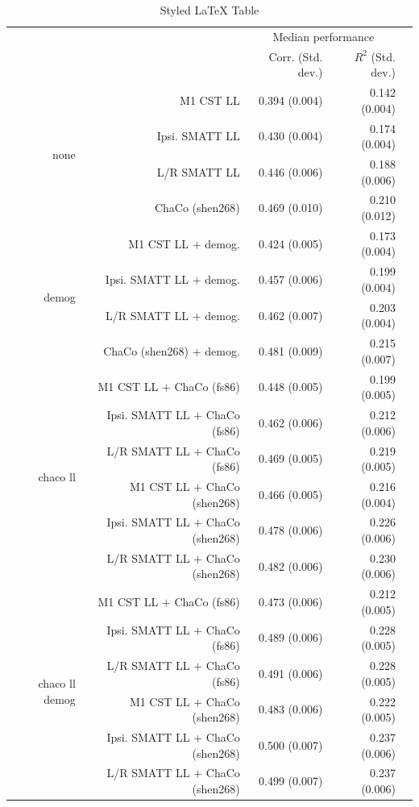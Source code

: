 \documentclass[10pt]{article}
\def\Plus{\texttt{+}}
\begin{document}
\begin{table}[h]
\centering
\caption{Styled LaTeX Table}
\label{table:5}
\begin{tabular}{rrrrr}
\toprule
 &  & \multicolumn{2}{c}{Median performance} \\
 &  & Corr. (Std. dev.) & $R^2$ (Std. dev.) \\
\midrule
\multirow[t]{4}{*}{none} & M1 CST LL & 0.394 (0.004) & 0.142 (0.004) \\
 & Ipsi. SMATT LL & 0.430 (0.004) & 0.174 (0.004) \\
 & L/R SMATT LL & 0.446 (0.006) & 0.188 (0.006) \\
 & ChaCo (shen268) & 0.469 (0.010) & 0.210 (0.012) \\
\multirow[t]{4}{*}{demog} & M1 CST LL $\Plus$ demog. & 0.424 (0.005) & 0.173 (0.004) \\
 & Ipsi. SMATT LL $\Plus$ demog. & 0.457 (0.006) & 0.199 (0.004) \\
 & L/R SMATT LL $\Plus$ demog. & 0.462 (0.007) & 0.203 (0.004) \\
 & ChaCo (shen268) $\Plus$ demog. & 0.481 (0.009) & 0.215 (0.007) \\
\multirow[t]{6}{*}{chaco ll} & M1 CST LL $\Plus$ ChaCo (fs86) & 0.448 (0.005) & 0.199 (0.005) \\
 & Ipsi. SMATT LL $\Plus$ ChaCo (fs86) & 0.462 (0.006) & 0.212 (0.006) \\
 & L/R SMATT LL $\Plus$ ChaCo (fs86) & 0.469 (0.005) & 0.219 (0.005) \\
 & M1 CST LL $\Plus$ ChaCo (shen268) & 0.466 (0.005) & 0.216 (0.004) \\
 & Ipsi. SMATT LL $\Plus$ ChaCo (shen268) & 0.478 (0.006) & 0.226 (0.006) \\
 & L/R SMATT LL $\Plus$ ChaCo (shen268) & 0.482 (0.006) & 0.230 (0.006) \\
\multirow[t]{6}{*}{chaco ll demog} & M1 CST LL $\Plus$ ChaCo  (fs86) & 0.473 (0.006) & 0.212 (0.005) \\
 & Ipsi. SMATT LL $\Plus$ ChaCo  (fs86) & 0.489 (0.006) & 0.228 (0.005) \\
 & L/R SMATT LL $\Plus$ ChaCo  (fs86) & 0.491 (0.006) & 0.228 (0.005) \\
 & M1 CST LL $\Plus$ ChaCo  (shen268) & 0.483 (0.006) & 0.222 (0.005) \\
 & Ipsi. SMATT LL $\Plus$ ChaCo  (shen268) & 0.500 (0.007) & 0.237 (0.006) \\
 & L/R SMATT LL $\Plus$ ChaCo  (shen268) & 0.499 (0.007) & 0.237 (0.006) \\
\bottomrule
\end{tabular}
\end{table}
\end{document}
